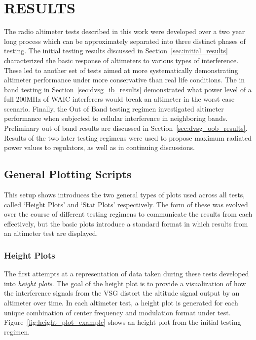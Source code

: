 %
%
%
%

\chapter{RESULTS}
The radio altimeter tests described in this work were developed over a two year long process which can be approximately separated into three distinct phases of testing. The initial testing results discussed in Section~\ref{sec:initial_results} characterized the basic response of altimeters to various types of interference. These led to another set of tests aimed at more systematically demonstrating altimeter performance under more conservative than real life conditions. The in band testing in Section~\ref{sec:dvsg_ib_results} demonstrated what power level of a full 200MHz of WAIC interferers would break an altimeter in the worst case scenario. Finally, the Out of Band testing regimen investigated altimeter performance when subjected to cellular interference in neighboring bands. Preliminary out of band results are discussed in Section~\ref{sec:dvsg_oob_results}. Results of the two later testing regimens were used to propose maximum radiated power values to  regulators, as well as in continuing discussions. 

\section{General Plotting Scripts}
This setup shows introduces the two general types of plots used across all tests, called `Height Plots' and `Stat Plots' respectively. The form of these was evolved over the course of different testing regimens to communicate the results from each effectively, but the basic plots introduce a standard format in which results from an altimeter test are displayed. 
\subsection{Height Plots}
The first attempts at a representation of data taken during these tests developed into \textit{height plots}. The goal of the height plot is to provide a visualization of how the interference signals from the VSG  distort the altitude signal output by an altimeter over time. In each altimeter test, a height plot is generated for each unique combination of center frequency and modulation format under test. Figure~\ref{fig:height_plot_example} shows an height plot from the initial testing regimen. 

